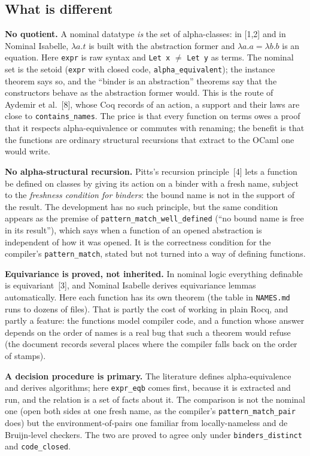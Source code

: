 \documentclass[10pt,a4paper]{article}
\newcommand\code[1]{\texttt{#1}}
\begin{document}
\subsection{What is different}

\textbf{No quotient.} A nominal datatype \emph{is} the set of alpha-classes: in
[1,2] and in Nominal Isabelle, $\lambda a.t$ is built with the abstraction
former and $\lambda a.a = \lambda b.b$ is an equation. Here \code{expr} is raw
syntax and \code{Let x} $\neq$ \code{Let y} as terms. The nominal set is the
setoid (\code{expr} with closed code, \code{alpha\_equivalent}); the instance
theorem says so, and the ``binder is an abstraction'' theorems say that the
constructors behave as the abstraction former would. This is the route of
Aydemir et al.~[8], whose Coq records of an action, a support and their laws
are close to \code{contains\_names}. The price is that every function on terms
owes a proof that it respects alpha-equivalence or commutes with renaming; the
benefit is that the functions are ordinary structural recursions that extract
to the OCaml one would write.

\textbf{No alpha-structural recursion.} Pitts's recursion principle~[4] lets a
function be defined on classes by giving its action on a binder with a fresh
name, subject to the \emph{freshness condition for binders}: the bound name is
not in the support of the result. The development has no such principle, but
the same condition appears as the premise of
\code{pattern\_match\_well\_defined} (``no bound name is free in its
result''), which says when a function of an opened abstraction is independent
of how it was opened. It is the correctness condition for the compiler's
\code{pattern\_match}, stated but not turned into a way of defining functions.

\textbf{Equivariance is proved, not inherited.} In nominal logic everything
definable is equivariant~[3], and Nominal Isabelle derives equivariance lemmas
automatically. Here each function has its own theorem (the table in
\code{NAMES.md} runs to dozens of files). That is partly the cost of working in
plain Rocq, and partly a feature: the functions model compiler code, and a
function whose answer depends on the order of names is a real bug that such a
theorem would refuse (the document records several places where the compiler
falls back on the order of stamps).

\textbf{A decision procedure is primary.} The literature defines
alpha-equivalence and derives algorithms; here \code{expr\_eqb} comes first,
because it is extracted and run, and the relation is a set of facts about it.
The comparison is not the nominal one (open both sides at one fresh name, as
the compiler's \code{pattern\_match\_pair} does) but the environment-of-pairs
one familiar from locally-nameless and de Bruijn-level checkers. The two are
proved to agree only under \code{binders\_distinct} and \code{code\_closed}.
\end{document}
